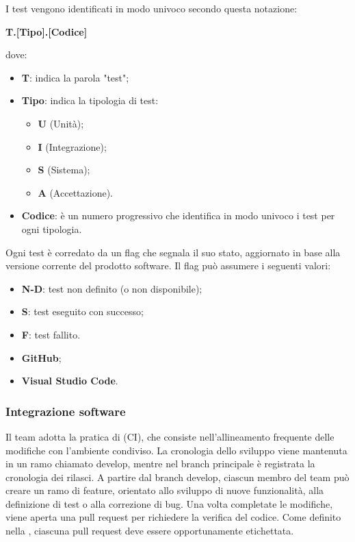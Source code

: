\par I test vengono identificati in modo univoco secondo questa notazione: 
\par \quad \textbf{T.[Tipo].[Codice]}
\par dove: 
\begin{itemize}
    \item \textbf{T}: indica la parola "test";
    \item \textbf{Tipo}: indica la tipologia di test: 
        \begin{itemize}
            \item \textbf{U} (Unità); 
            \item \textbf{I} (Integrazione);
            \item \textbf{S} (Sistema);
            \item \textbf{A} (Accettazione).
        \end{itemize}
    \item \textbf{Codice}: è un numero progressivo che identifica in modo univoco i test per ogni tipologia.
\end{itemize}

\par Ogni test è corredato da un flag che segnala il suo stato, aggiornato in base alla versione corrente del prodotto software. Il flag può assumere i seguenti valori:
\begin{itemize}
    \item \textbf{N-D}: test non definito (o non disponibile);
    \item \textbf{S}: test eseguito con successo;
    \item \textbf{F}: test fallito.
\end{itemize}

\begin{itemize}
  \item \textbf{GitHub};
  \item \textbf{Visual Studio Code}.
\end{itemize}

\subsubsection{Integrazione software}
\par Il team adotta la pratica di  (CI), che consiste nell’allineamento frequente delle modifiche con l’ambiente condiviso. La cronologia dello sviluppo viene mantenuta in un ramo chiamato develop, mentre nel branch principale è registrata la cronologia dei rilasci. A partire dal branch develop, ciascun membro del team può creare un ramo di feature, orientato allo sviluppo di nuove funzionalità, alla definizione di test o alla correzione di bug. Una volta completate le modifiche, viene aperta una pull request per richiedere la verifica del codice. Come definito nella , ciascuna pull request deve essere opportunamente etichettata.

